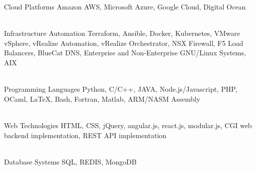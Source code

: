 


\begin{cvskills}


\cvskill
{Cloud Platforms} %
{Amazon AWS, Microsoft Azure, Google Cloud, Digital Ocean} %

\\


\cvskill
{Infrastructure Automation} %
{Terraform, Ansible, Docker, Kubernetes, VMware vSphere, vRealize Automation, \newline vRealize Orchestrator, NSX Firewall, F5 Load Balancers, BlueCat DNS, \newline Enterprise and Non-Enterprise GNU/Linux Systems, AIX} %

\\


\cvskill
{Programming Languages} %
{Python, C/C++, JAVA, Node.js/Javascript, PHP, OCaml, \LaTeX, Bash, Fortran, Matlab, \newline ARM/NASM Assembly} %

\\


\cvskill
{Web Technologies} %
{HTML, CSS, jQuery, angular.js, react.js, modular.js, CGI web backend implementation, \newline REST API implementation} %

\\


\cvskill
{Database Systems} %
{SQL, REDIS, MongoDB} %


\end{cvskills}
